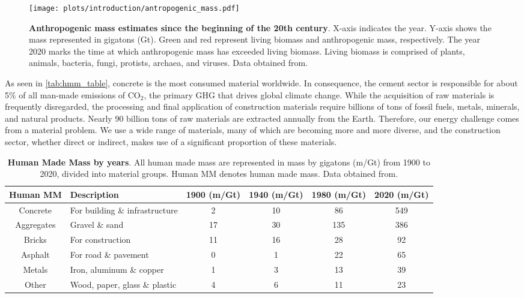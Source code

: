 \begin{figure}[ht!]
  \centering
  \texttt{[image: plots/introduction/antropogenic\_mass.pdf]}
  \caption[ Anthropogenic mass estimates since the beginning of the 20th century.]{\textbf{ Anthropogenic mass estimates since the beginning of the 20th century}. X-axis indicates the year. Y-axis shows the mass represented in gigatons (Gt). Green and red represent living biomass and anthropogenic mass, respectively. The year 2020 marks the time at which  anthropogenic mass has exceeded living biomass. Living biomass is comprised of plants, animals, bacteria, fungi, protists, archaea, and viruses. Data obtained from.\autocite{elhacham2020global}}
  \label{fig:antropogenic}
\end{figure}

As seen in \autoref{tab:hmm_table}, concrete is the most consumed material worldwide. In consequence, the cement sector is responsible for about 5\% of all man-made emissions of CO$_2$, the primary GHG that drives global climate change.\autocite{calkins2008materials} While the acquisition of raw materials is frequently disregarded, the processing and final application of construction materials require billions of tons of fossil fuels, metals, minerals, and natural products. Nearly 90 billion tons of raw materials are extracted annually from the Earth.\autocite{krausmann2009growth} Therefore, our energy challenge comes from a material problem. We use a wide range of materials, many of which are becoming more and more diverse, and the construction sector, whether direct or indirect, makes use of a significant proportion of these materials.

\begin{table}[!htb]
  \caption[Human Made Mass by years]{\textbf{Human Made Mass by years}. All human made mass are represented in mass by gigatons (m/Gt) from 1900 to 2020, divided into material groups. Human MM denotes human made mass. Data obtained from.\autocite{krausmann2017global}}
  \begin{scriptsize}
    \begin{tabulary}{0.65\linewidth}{clcccc}
      \textbf{Human MM} & \textbf{Description} & \textbf{1900 (m/Gt)} & \textbf{1940 (m/Gt)} & \textbf{1980 (m/Gt)} & \textbf{2020 (m/Gt)} \\ \hline
      Concrete & For building \& infrastructure & 2 & 10 & 86 & 549  \\
      Aggregates & Gravel \& sand & 17 & 30 & 135 & 386  \\
      Bricks & For construction & 11 & 16 & 28 & 92  \\
      Asphalt & For road \& pavement & 0 & 1 & 22 & 65  \\
      Metals & Iron, aluminum \& copper & 1 & 3 & 13 & 39  \\
      Other & Wood, paper, glass \& plastic & 4 & 6 & 11 & 23  \\
    \end{tabulary}
  \end{scriptsize}
  \label{tab:hmm_table}
\end{table}

